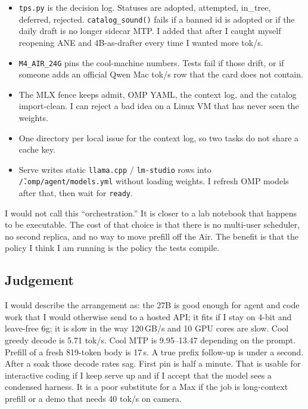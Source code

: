 \begin{itemize}[leftmargin=1.4em]
\item \texttt{tps.py} is the decision log. Statuses are adopted, attempted, in\_tree, deferred, rejected. \texttt{catalog\_sound()} fails if a banned id is adopted or if the daily draft is no longer sidecar MTP. I added that after I caught myself reopening ANE and 4B-as-drafter every time I wanted more tok/s.
\item \texttt{M4\_AIR\_24G} pins the cool-machine numbers. Tests fail if those drift, or if someone adds an official Qwen Mac tok/s row that the card does not contain.
\item The MLX fence keeps admit, OMP YAML, the context log, and the catalog import-clean. I can reject a bad idea on a Linux VM that has never seen the weights.
\item One directory per local issue for the context log, so two tasks do not share a cache key.
\item Serve writes static \texttt{llama.cpp} / \texttt{lm-studio} rows into \texttt{\~/.omp/agent/models.yml} without loading weights. I refresh OMP models after that, then wait for \texttt{ready}.
\end{itemize}

I would not call this ``orchestration.'' It is closer to a lab notebook that happens to be executable. The cost of that choice is that there is no multi-user scheduler, no second replica, and no way to move prefill off the Air. The benefit is that the policy I think I am running is the policy the tests compile.

\subsection{Judgement}

I would describe the arrangement as: the 27B is good enough for agent and code work that I would otherwise send to a hosted API; it fits if I stay on 4-bit and leave-free 6g; it is slow in the way 120\,GB/s and 10 GPU cores are slow. Cool greedy decode is 5.71 tok/s. Cool MTP is 9.95--13.47 depending on the prompt. Prefill of a fresh 819-token body is 17\,s. A true prefix follow-up is under a second. After a soak those decode rates sag. First pin is half a minute. That is usable for interactive coding if I keep serve up and if I accept that the model sees a condensed harness. It is a poor substitute for a Max if the job is long-context prefill or a demo that needs 40 tok/s on camera.

